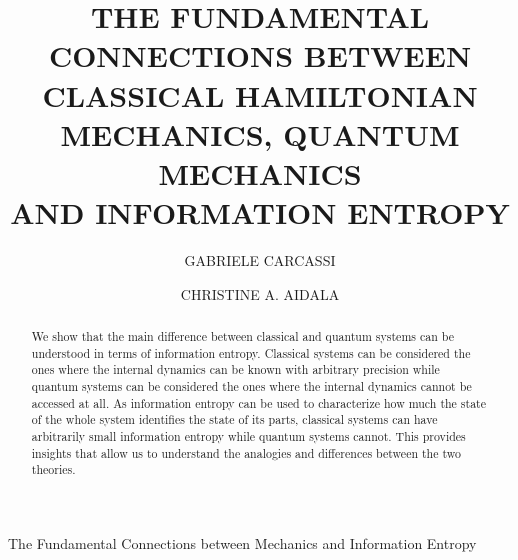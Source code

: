 \documentclass{ws-ijqi}
\begin{document}
\catchline{}{}{}{}{}

\title{THE FUNDAMENTAL CONNECTIONS BETWEEN CLASSICAL HAMILTONIAN MECHANICS, QUANTUM MECHANICS \\ AND INFORMATION ENTROPY}

\author{GABRIELE CARCASSI}

\address{Physics Department, University of Michigan, 450 Church Street\\
Ann Arbor, MI 48109-1040,
United States\\
carcassi@umich.edu}

\author{CHRISTINE A. AIDALA}

\address{Physics Department, University of Michigan, 450 Church Street\\
Ann Arbor, MI 48109-1040,
United States\\
caidala@umich.edu}

\maketitle

\begin{history}
\end{history}

\begin{abstract}
We show that the main difference between classical and quantum systems can be understood in terms of information entropy. Classical systems can be considered the ones where the internal dynamics can be known with arbitrary precision while quantum systems can be considered the ones where the internal dynamics cannot be accessed at all. As information entropy can be used to characterize how much the state of the whole system identifies the state of its parts, classical systems can have arbitrarily small information entropy while quantum systems cannot. This provides insights that allow us to understand the analogies and differences between the two theories.
\end{abstract}



{The Fundamental Connections between Mechanics and Information Entropy}
\end{document}
